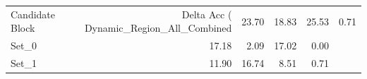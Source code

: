 \begin{tabular}{lrrrr}
\toprule
Candidate Block & Delta Acc (%
\midrule
Dynamic_Region_All_Combined & 23.70 & 18.83 & 25.53 & 0.71 \\
Set_0 & 17.18 & 2.09 & 17.02 & 0.00 \\
Set_1 & 11.90 & 16.74 & 8.51 & 0.71 \\
\bottomrule
\end{tabular}
